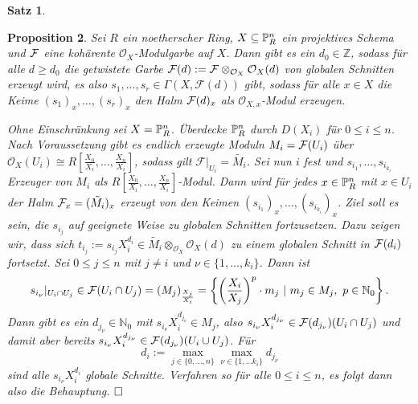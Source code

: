 \documentclass[11pt]{book}
\newtheorem{theorem}{Satz}[section]
\newtheorem{proposition}[theorem]{Proposition}
\theoremstyle{nonumberbreak}
\newenvironment{pr}[1][]{\ifthenelse{\equal{#1}{}}{\proof}{\proof[#1]}\rm}{\endproof}
\begin{document}
\begin{spacing}{1.4}
\begin{theorem}
\begin{pr}
\begin{compactenum}
\begin{compactenum}
\begin{compactenum}
\end{compactenum}



\end{compactenum}

\end{compactenum}


\end{pr}


\end{theorem}


\begin{proposition}   %
 Sei $R$ ein noetherscher Ring, $X \subseteq \mathbb{P}^n_R$ ein projektives Schema und $\mathcal{F}$ eine kohärente $\mathcal{O}_X$-Modulgarbe auf $X$. Dann gibt es ein $d_0 \in \mathbb{Z}$, sodass für alle $d \geqslant d_0$ die getwistete Garbe $\mathcal{F}(d) := \mathcal{F} \otimes_{\mathcal{O}_X} \mathcal{O}_X(d)$ von globalen Schnitten erzeugt wird, es also $s_1, \ldots, s_r \in \Gamma( X, \mathcal{F}(d))$ gibt, sodass für alle $x \in X$ die Keime $(s_1)_x, \ldots, (s_r)_x$ den Halm $\mathcal{F}(d)_x$ als $\mathcal{O}_{X,x}$-Modul erzeugen.
 
 \begin{pr}
Ohne Einschränkung sei $X= \mathbb{P}^n_R$. Überdecke $\mathbb{P}^n_R$ durch $D(X_i)$ für $0 \leqslant i \leqslant n$. Nach Voraussetzung gibt es endlich erzeugte Moduln $M_i= \mathcal{F}(U_i)$ über $\mathcal{O}_X(U_i) \cong R\left[ \frac{X_0}{X_i}, \ldots, \frac{X_n}{X_i} \right]$, sodass gilt $\mathcal{F}\vert_{U_i} = \tilde{M_i}$. Sei nun $i$ fest und $s_{i_1}, \ldots, s_{i_{k_i}}$ Erzeuger von $M_i$ als $R\left[ \frac{X_0}{X_i}, \ldots, \frac{X_n}{X_i} \right]$-Modul. Dann wird für jedes $x \in \mathbb{P}^n_R$ mit $x \in U_i$ der Halm $\mathcal{F}_x= (\tilde{M_i})_x$ erzeugt von den Keimen $(s_{i_1})_x, \ldots, (s_{i_{k_i}})_x$. Ziel soll es sein, die $s_{i_{j}}$ auf geeignete Weise zu globalen Schnitten fortzusetzen. Dazu zeigen wir, dass sich $t_{i_j}:= s_{i_j} X_i^{d_i} \in \tilde{M_i} \otimes_{\mathcal{O}_X} \mathcal{O}_X(d)$ zu einem globalen Schnitt in $\mathcal{F}(d_i)$ fortsetzt. Sei $ 0 \leqslant j \leqslant n$ mit $j\neq i$ und $\nu \in \{1, \ldots, k_i\}$. Dann ist $$s_{i_{\nu}} \vert_{U_i \cap U_j} \in \mathcal{F}(U_i \cap U_j) = (M_j)_{\frac{X_j}{X_i}} = \left\{ \left(\frac{X_i}{X_j}\right)^p \cdot m_j \ \vert \ m_j \in M_j, \ p \in \mathbb{N}_0 \right\}.$$
Dann gibt es ein $d_{j_{\nu}} \in \mathbb{N}_0$ mit $s_{i_{\nu}} X_i^{d_{j_{\nu}}} \in M_j$, also $s_{i_{\nu}} X_i^{d_{j_{\nu}}} \in \mathcal{F}(d_{j_{\nu}})(U_i \cap U_j)$ und damit aber bereits $s_{i_{\nu}} X_i^{d_{j_{\nu}}} \in \mathcal{F}(d_{j_{\nu}})(U_i \cup U_j)$. Für
$$d_i := \max_{j\in \{0, \ldots, n \}} \max _{\nu \in \{1, \ldots k_i\}} d_{j_{\nu}}$$
sind alle $s_{i_{\nu}}X_i^{d_i}$ globale Schnitte. Verfahren so für alle $0 \leqslant i \leqslant n$, es folgt dann also die Behauptung. $\hfill \Box$
 

\end{pr}
\end{proposition}
\end{spacing}
\end{document}
